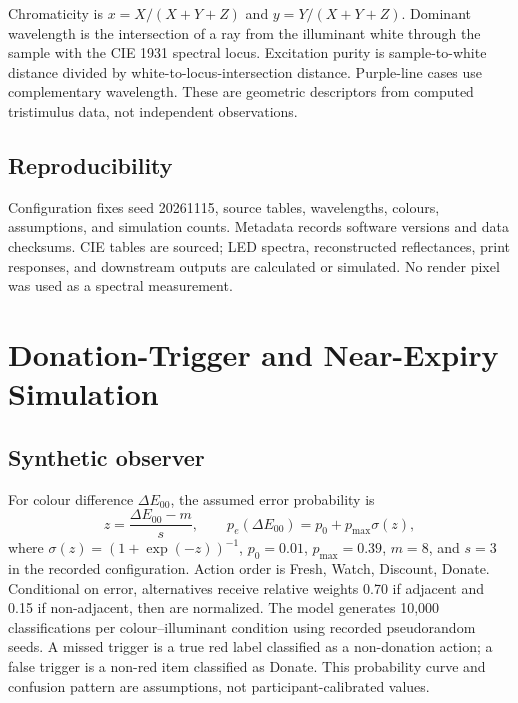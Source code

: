 \documentclass[journal]{IEEEtran}
\newcommand{\dE}{\ensuremath{\Delta E_{00}}}
\begin{document}
Chromaticity is $x=X/(X+Y+Z)$ and $y=Y/(X+Y+Z)$. Dominant wavelength is the intersection of a ray from the illuminant white through the sample with the CIE 1931 spectral locus. Excitation purity is sample-to-white distance divided by white-to-locus-intersection distance. Purple-line cases use complementary wavelength. These are geometric descriptors from computed tristimulus data, not independent observations.

\subsection{Reproducibility}
Configuration fixes seed 20261115, source tables, wavelengths, colours, assumptions, and simulation counts. Metadata records software versions and data checksums. CIE tables are sourced; LED spectra, reconstructed reflectances, print responses, and downstream outputs are calculated or simulated. No render pixel was used as a spectral measurement.

\section{Donation-Trigger and Near-Expiry Simulation}
\subsection{Synthetic observer}
For colour difference $\dE$, the assumed error probability is
\begin{equation}
z=\frac{\dE-m}{s},\qquad p_e(\dE)=p_0+p_{\max}\sigma(z),
\end{equation}
where $\sigma(z)=(1+\exp(-z))^{-1}$, $p_0=0.01$, $p_{\max}=0.39$, $m=8$, and $s=3$ in the recorded configuration.
Action order is Fresh, Watch, Discount, Donate. Conditional on error, alternatives receive relative weights 0.70 if adjacent and 0.15 if non-adjacent, then are normalized. The model generates 10,000 classifications per colour--illuminant condition using recorded pseudorandom seeds. A missed trigger is a true red label classified as a non-donation action; a false trigger is a non-red item classified as Donate. This probability curve and confusion pattern are assumptions, not participant-calibrated values.
\end{document}
